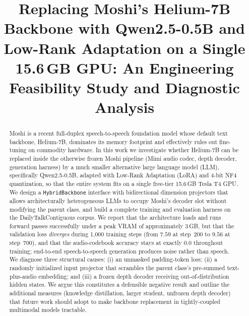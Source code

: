 \documentclass[conference]{IEEEtran}
\begin{document}
\title{Replacing Moshi's Helium-7B Backbone with Qwen2.5-0.5B and Low-Rank Adaptation on a Single 15.6\,GB GPU: An Engineering Feasibility Study and Diagnostic Analysis}

\author{
\and
{}
\and
{}
}

\maketitle

\begin{abstract}
Moshi is a recent full-duplex speech-to-speech foundation model whose default text backbone, Helium-7B, dominates its memory footprint and effectively rules out fine-tuning on commodity hardware. In this work we investigate whether Helium-7B can be replaced inside the otherwise frozen Moshi pipeline (Mimi audio codec, depth decoder, generation harness) by a much smaller alternative large language model (LLM), specifically Qwen2.5-0.5B, adapted with Low-Rank Adaptation (LoRA) and 4-bit NF4 quantization, so that the entire system fits on a single free-tier 15.6\,GB Tesla T4 GPU. We design a \texttt{HybridBackbone} interface with bidirectional dimension projectors that allows architecturally heterogeneous LLMs to occupy Moshi's decoder slot without modifying the parent class, and build a complete training and evaluation harness on the DailyTalkContiguous corpus. We report that the architecture loads and runs forward passes successfully under a peak VRAM of approximately 3\,GB, but that the validation loss \emph{diverges} during 1{,}000 training steps (from $7.59$ at step~200 to $9.56$ at step~700), and that the audio-codebook accuracy stays at exactly $0.0$ throughout training; end-to-end speech-to-speech generation produces noise rather than speech. We diagnose three structural causes: (i) an unmasked padding-token loss; (ii) a randomly initialized input projector that scrambles the parent class's pre-summed text-plus-audio embedding; and (iii) a frozen depth decoder receiving out-of-distribution hidden states. We argue this constitutes a defensible negative result and outline the additional measures (knowledge distillation, larger student, unfrozen depth decoder) that future work should adopt to make backbone replacement in tightly-coupled multimodal models tractable.
\end{abstract}
\end{document}
